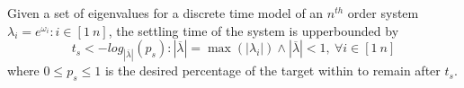 \documentclass[sigconf]{llncs}
\begin{document}
\begin{theorem}
Given a set of eigenvalues for a discrete time model of an $n^{th}$ order system $\lambda_i =e^{\omega_i}: i \in [1\ n]$, the settling time of the system is upperbounded by
\begin{equation}
t_s<-log_{|\overline{\lambda}|}({p_s}) : |\overline{\lambda}| =\max(|\lambda_i|) \wedge |\overline{\lambda}|<1,\ \forall i \in [1\ n]
\label{eq:set_time}
\end{equation}
where $0\leq p_s \leq 1$ is the desired percentage of the target within  to remain after $t_s$.
\end{theorem}
\end{document}
